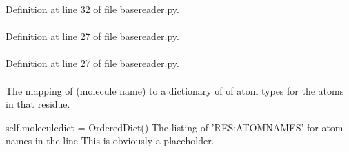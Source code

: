 \-Definition at line 32 of file basereader.\-py.

\hypertarget{classforcebalance_1_1basereader_1_1BaseReader_aefd7807e31c2b6bb924a3e61e6fd72ed}{
\paragraph[{itype}]{}}\label{classforcebalance_1_1basereader_1_1BaseReader_aefd7807e31c2b6bb924a3e61e6fd72ed}


\-Definition at line 27 of file basereader.\-py.

\hypertarget{classforcebalance_1_1basereader_1_1BaseReader_a79ecd58dd1effef63dd5194985c93b3d}{
\paragraph[{ln}]{}}\label{classforcebalance_1_1basereader_1_1BaseReader_a79ecd58dd1effef63dd5194985c93b3d}


\-Definition at line 27 of file basereader.\-py.

\hypertarget{classforcebalance_1_1basereader_1_1BaseReader_afdd6957af262cf780d00fdc6f0f5e9ba}{
\paragraph[{molatom}]{}}\label{classforcebalance_1_1basereader_1_1BaseReader_afdd6957af262cf780d00fdc6f0f5e9ba}


\-The mapping of (molecule name) to a dictionary of of atom types for the atoms in that residue. 

self.\-moleculedict = \-Ordered\-Dict() \-The listing of '\-R\-E\-S\-:\-A\-T\-O\-M\-N\-A\-M\-E\-S' for atom names in the line \-This is obviously a placeholder. 

